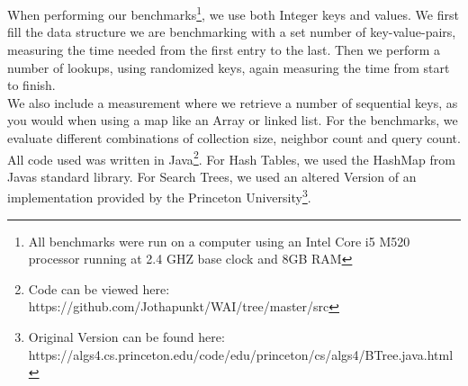 \section{}
When performing our benchmarks\footnote{All benchmarks were run on a computer using an Intel Core i5 M520 processor running at 2.4 GHZ base clock and 8GB RAM}, we use both Integer keys and values. We first fill the data structure we are benchmarking with a set number of key-value-pairs, measuring the time needed from the first entry to the last. Then we perform a number of lookups, using randomized keys, again measuring the time from start to finish.\\ 
We also include a measurement where we retrieve a number of sequential keys, as you would when using a map like an Array or linked list.  For the benchmarks, we evaluate different combinations of collection size, neighbor count and query count. 
All code used was written in Java\footnote{Code can be viewed here: https://github.com/Jothapunkt/WAI/tree/master/src}. For Hash Tables, we used the HashMap from Javas standard library. For Search Trees, we used an altered Version of an implementation provided by the Princeton University\footnote{Original Version can be found here: https://algs4.cs.princeton.edu/code/edu/princeton/cs/algs4/BTree.java.html}.